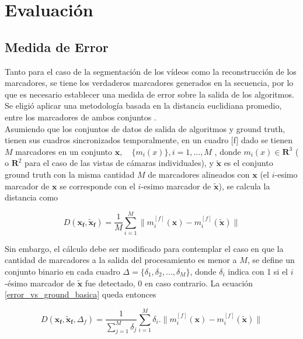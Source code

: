 \section{Evaluación}

\subsection{Medida de Error}
\label{subsec:medida_error}

Tanto para el caso de la segmentación de los vídeos como la reconstrucción de los marcadores, se tiene los verdaderos marcadores generados en la secuencia, por lo que es necesario establecer una medida de error sobre la salida de los algoritmos. Se eligió aplicar una metodología basada en la distancia euclidiana promedio, entre los marcadores de ambos conjuntos \cite{humaneva} . 
\\ 

Asumiendo que los conjuntos de datos de salida de algoritmos y ground truth, tienen sus cuadros sincronizados temporalmente, en un cuadro [f] dado se tienen $M$ marcadores en un conjunto $ \boldsymbol{x},\quad\{m_{i}(x)\},i=1,\ldots,M $ , donde $ m_{i}(x)\in{\mathbf{R}^{3}} $ ( o $ \mathbf{R}^{2} $ para el caso de las vistas de cámaras individuales), y $ \boldsymbol{\tilde{x}} $ es el conjunto ground truth con la misma cantidad $M$ de marcadores alineados con $\boldsymbol{x}$ (el $i$-esimo marcador de $\boldsymbol{x}$ se corresponde con el  $i$-esimo marcador de $\boldsymbol{\tilde{x}}$), se calcula la distancia como

\begin{equation} \label{error_vs_ground_basica}
D(\boldsymbol{x_{f}},\boldsymbol{\tilde{x}_{f}})=\frac{1}{M}\sum_{i=1}^{M} \|m_{i}^{[f]}(\boldsymbol{x})-m_{i}^{[f]}(\boldsymbol{\tilde{x}})\|
\end{equation}

Sin embargo, el cálculo debe ser modificado para contemplar el caso en que la cantidad de marcadores a la salida del procesamiento es menor a $M$, se define un conjunto binario en cada cuadro $\Delta=\{\delta_1,\delta_2,\ldots,\delta_M\}$, donde $\delta_i$ indica con 1 si el $i$-ésimo marcador de $\boldsymbol{\tilde{x}}$ fue detectado, $0$ en caso contrario. La ecuación \eqref{error_vs_ground_basica} queda entonces

\begin{equation}\label{error_vs_ground_deteccion}
D(\boldsymbol{x_{f}},\boldsymbol{\tilde{x}_{f}},\Delta_{f})=\frac{1}{\sum_{j=1}^{M} \delta_j} \sum_{i=1}^{M} \delta_i.\|m_{i}^{[f]}(\boldsymbol{x})-m_{i}^{[f]}(\boldsymbol{\tilde{x}})\|
\end{equation}

